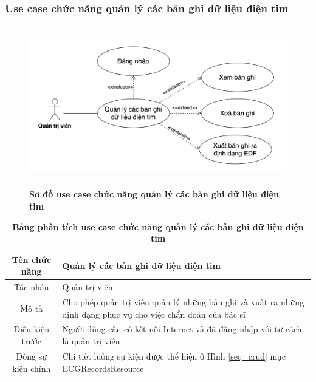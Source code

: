 \subsubsection{Use case chức năng quản lý các bản ghi dữ liệu điện tim}
  \begin{figure}[H]
    \centering
    \includegraphics[width=15cm,height=7cm]{Images/use_case/use_case_manage_records.png}
    \caption[Sơ đồ use case chức năng quản lý các bản ghi dữ liệu điện tim]{\bfseries \fontsize{12pt}{0pt}
    \selectfont Sơ đồ use case chức năng quản lý các bản ghi dữ liệu điện tim}
    \label{use_case_manage_records} %
  \end{figure}

  \begin{table}[H]
    \caption{\bfseries \fontsize{12pt}{0pt}\selectfont Bảng phân tích use case chức năng quản lý các bản ghi dữ liệu điện tim}
    \centering
    \begin{tabularx}{0.9\textwidth}{|c|X|}
      \hline
      \textbf{Tên chức năng} & \textbf{Quản lý các bản ghi dữ liệu điện tim} \\
      \hline
      Tác nhân & Quản trị viên \\
      \hline
      Mô tả & Cho phép quản trị viên quản lý  những bản ghi và xuất ra những định dạng phục vụ cho việc chẩn đoán của bác sĩ \\
      \hline
      Điều kiện trước & Người dùng cần có kết nối Internet và đã đăng nhập với tư cách là quản trị viên \\
      \hline
      Dòng sự kiện chính & 
        Chi tiết luồng sự kiện được thể hiện ở Hình \ref{seq_crud} mục ECGRecordsResource\\
      \hline
    \end{tabularx}
  \end{table}

